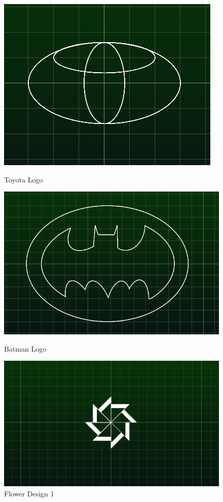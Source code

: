 \begin{figure}
\begin{center}
\includegraphics[scale=0.4]{images/lualogo/toyota.png}
\caption{Toyota Logo}
\includegraphics[scale=0.4]{images/lualogo/batman.png} 
\caption{Batman Logo}
\includegraphics[scale=0.3]{images/lualogo/chakra1.png}
\caption{Flower Design 1}
\end{center}
\end{figure}
